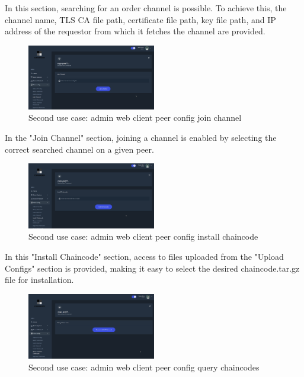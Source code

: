 In this section, searching for an order channel is possible. To achieve this, the channel name, TLS CA file path, certificate file path, key file path, and IP address of the requestor from which it fetches the channel are provided.

\begin{figure}[H]
    \centering
    \includegraphics[width=0.5\textwidth]{assets/use-case-2/peer-config-join-channel.png} %
    \caption{Second use case: admin web client peer config join channel}
    \label{fig:sample-image} 
\end{figure}

In the "Join Channel" section, joining a channel is enabled by selecting the correct searched channel on a given peer.

\begin{figure}[H]
    \centering
    \includegraphics[width=0.5\textwidth]{assets/use-case-2/peer-config-install-chaincode.png} %
    \caption{Second use case: admin web client peer config install chaincode}
    \label{fig:sample-image} 
\end{figure}

In this "Install Chaincode" section, access to files uploaded from the "Upload Configs" section is provided, making it easy to select the desired chaincode.tar.gz file for installation.

\begin{figure}[H]
    \centering
    \includegraphics[width=0.5\textwidth]{assets/use-case-2/peer-config-query-chaincode.png} %
    \caption{Second use case: admin web client peer config query chaincodes}
    \label{fig:sample-image} 
\end{figure}

